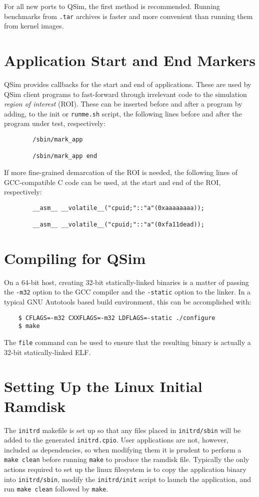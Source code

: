 \documentclass[letterpaper, 10pt]{book}
\begin{document}
For all new ports to QSim, the first method is recommended. Running benchmarks
from \texttt{.tar} archives is faster and more convenient than running them from
kernel images.

\section{Application Start and End Markers}
QSim provides callbacks for the start and end of applications. These are used by
QSim client programs to fast-forward through irrelevant code to the simulation
\textit{region of interest} (ROI). These can be inserted before and after a
program by adding, to the init or \texttt{runme.sh} script, the following lines
before and after the program under test, respectively:

\begin{verbatim}
        /sbin/mark_app

        /sbin/mark_app end
\end{verbatim}

If more fine-grained demarcation of the ROI is needed, the following lines of
GCC-compatible C code can be used, at the start and end of the ROI,
respectively:

\begin{verbatim}
        __asm__ __volatile__("cpuid;"::"a"(0xaaaaaaaa));

        __asm__ __volatile__("cpuid;"::"a"(0xfa11dead));
\end{verbatim}

\section{Compiling for QSim}
On a 64-bit host, creating 32-bit statically-linked binaries is a matter of 
passing the \texttt{-m32} option to the GCC compiler and the \texttt{-static}
option to the linker. In a typical GNU Autotools based build environment, this
can be accomplished with:

\begin{verbatim}
    $ CFLAGS=-m32 CXXFLAGS=-m32 LDFLAGS=-static ./configure
    $ make
\end{verbatim}

The \texttt{file} command can be used to ensure that the resulting binary is
actually a 32-bit statically-linked ELF.

\section{Setting Up the Linux Initial Ramdisk}
The \texttt{initrd} makefile is set up so that any files placed in 
\texttt{initrd/sbin} will be added to the generated \texttt{initrd.cpio}. User
applications are not, however, included as dependencies, so when modifying them
it is prudent to perform a \texttt{make clean} before running \texttt{make} to
produce the ramdisk file. Typically the only actions required to set up the
linux filesystem is to copy the application binary into \texttt{initrd/sbin},
modify the \texttt{initrd/init} script to launch the application, and run
\texttt{make clean} followed by \texttt{make}.
\end{document}
